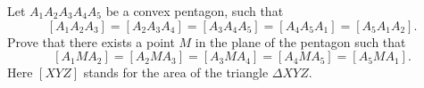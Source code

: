 Let $ A_{1}A_{2}A_{3}A_{4}A_{5}$ be a convex pentagon, such that
\[ [A_{1}A_{2}A_{3}] = [A_{2}A_{3}A_{4}] = [A_{3}A_{4}A_{5}] = [A_{4}A_{5}A_{1}] = [A_{5}A_{1}A_{2}].\]
Prove that there exists a point  $ M$ in the plane of the pentagon such that
\[ [A_{1}MA_{2}] = [A_{2}MA_{3}] = [A_{3}MA_{4}] = [A_{4}MA_{5}] = [A_{5}MA_{1}].\]
Here $ [XYZ]$ stands for the area of the triangle $ \Delta XYZ$.